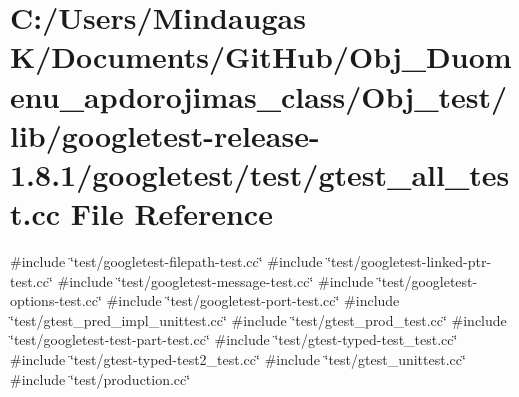 \hypertarget{_obj__test_2lib_2googletest-release-1_88_81_2googletest_2test_2gtest__all__test_8cc}{}\section{C\+:/\+Users/\+Mindaugas K/\+Documents/\+Git\+Hub/\+Obj\+\_\+\+Duomenu\+\_\+apdorojimas\+\_\+class/\+Obj\+\_\+test/lib/googletest-\/release-\/1.8.1/googletest/test/gtest\+\_\+all\+\_\+test.cc File Reference}
\label{_obj__test_2lib_2googletest-release-1_88_81_2googletest_2test_2gtest__all__test_8cc}
{\ttfamily \#include \char`\"{}test/googletest-\/filepath-\/test.\+cc\char`\"{}}\newline
{\ttfamily \#include \char`\"{}test/googletest-\/linked-\/ptr-\/test.\+cc\char`\"{}}\newline
{\ttfamily \#include \char`\"{}test/googletest-\/message-\/test.\+cc\char`\"{}}\newline
{\ttfamily \#include \char`\"{}test/googletest-\/options-\/test.\+cc\char`\"{}}\newline
{\ttfamily \#include \char`\"{}test/googletest-\/port-\/test.\+cc\char`\"{}}\newline
{\ttfamily \#include \char`\"{}test/gtest\+\_\+pred\+\_\+impl\+\_\+unittest.\+cc\char`\"{}}\newline
{\ttfamily \#include \char`\"{}test/gtest\+\_\+prod\+\_\+test.\+cc\char`\"{}}\newline
{\ttfamily \#include \char`\"{}test/googletest-\/test-\/part-\/test.\+cc\char`\"{}}\newline
{\ttfamily \#include \char`\"{}test/gtest-\/typed-\/test\+\_\+test.\+cc\char`\"{}}\newline
{\ttfamily \#include \char`\"{}test/gtest-\/typed-\/test2\+\_\+test.\+cc\char`\"{}}\newline
{\ttfamily \#include \char`\"{}test/gtest\+\_\+unittest.\+cc\char`\"{}}\newline
{\ttfamily \#include \char`\"{}test/production.\+cc\char`\"{}}\newline
